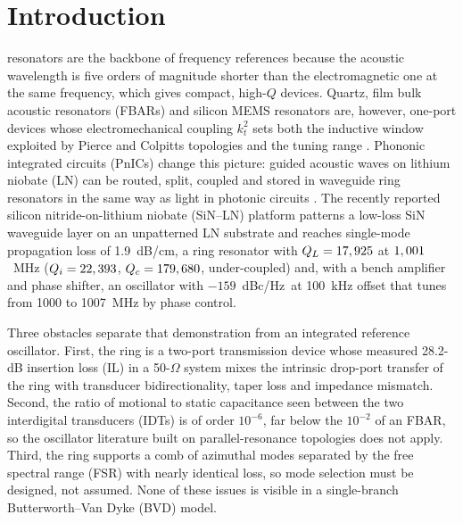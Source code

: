 \documentclass[journal]{IEEEtran}
\newcommand{\dBc}{dBc/Hz}
\begin{document}
\section{Introduction}
 resonators are the backbone of frequency references because the acoustic wavelength is five orders of magnitude shorter than the electromagnetic one at the same frequency, which gives compact, high-$Q$ devices. Quartz, film bulk acoustic resonators (FBARs) and silicon MEMS resonators are, however, one-port devices whose electromechanical coupling $k_t^2$ sets both the inductive window exploited by Pierce and Colpitts topologies and the tuning range \cite{vittoz1988,hashimoto2009}. Phononic integrated circuits (PnICs) change this picture: guided acoustic waves on lithium niobate (LN) can be routed, split, coupled and stored in waveguide ring resonators in the same way as light in photonic circuits \cite{fu2019,shao2019,mayor2021}. The recently reported silicon nitride-on-lithium niobate (SiN--LN) platform \cite{ji2026} patterns a low-loss SiN waveguide layer on an unpatterned LN substrate and reaches single-mode propagation loss of 1.9~dB/cm, a ring resonator with $Q_L=17,925$ at $1,001$~MHz ($Q_i=22,393$, $Q_c=179,680$, under-coupled) and, with a bench amplifier and phase shifter, an oscillator with $-159$~\dBc\ at 100~kHz offset that tunes from 1000 to 1007~MHz by phase control.

Three obstacles separate that demonstration from an integrated reference oscillator. First, the ring is a two-port transmission device whose measured 28.2-dB insertion loss (IL) in a 50-$\Omega$ system mixes the intrinsic drop-port transfer of the ring with transducer bidirectionality, taper loss and impedance mismatch. Second, the ratio of motional to static capacitance seen between the two interdigital transducers (IDTs) is of order $10^{-6}$, far below the $10^{-2}$ of an FBAR, so the oscillator literature built on parallel-resonance topologies does not apply. Third, the ring supports a comb of azimuthal modes separated by the free spectral range (FSR) with nearly identical loss, so mode selection must be designed, not assumed. None of these issues is visible in a single-branch Butterworth--Van Dyke (BVD) model.
\end{document}
